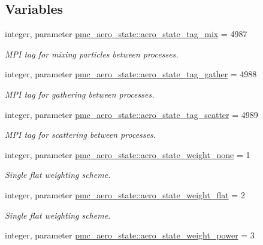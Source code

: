 \subsection*{Variables}
\begin{DoxyCompactItemize}
\item 
integer, parameter \mbox{\hyperlink{namespacepmc__aero__state_a585d061ace6ecfefa6eaadeb8efbeb5d}{pmc\+\_\+aero\+\_\+state\+::aero\+\_\+state\+\_\+tag\+\_\+mix}} = 4987
\begin{DoxyCompactList}\small\item\em M\+PI tag for mixing particles between processes. \end{DoxyCompactList}\item 
integer, parameter \mbox{\hyperlink{namespacepmc__aero__state_a8016b38f6c38806de95b72ffaecbe212}{pmc\+\_\+aero\+\_\+state\+::aero\+\_\+state\+\_\+tag\+\_\+gather}} = 4988
\begin{DoxyCompactList}\small\item\em M\+PI tag for gathering between processes. \end{DoxyCompactList}\item 
integer, parameter \mbox{\hyperlink{namespacepmc__aero__state_a47a81bec0174512abf54faf2673da5c3}{pmc\+\_\+aero\+\_\+state\+::aero\+\_\+state\+\_\+tag\+\_\+scatter}} = 4989
\begin{DoxyCompactList}\small\item\em M\+PI tag for scattering between processes. \end{DoxyCompactList}\item 
integer, parameter \mbox{\hyperlink{namespacepmc__aero__state_afae976ee50ab7c0415628dd99a6feded}{pmc\+\_\+aero\+\_\+state\+::aero\+\_\+state\+\_\+weight\+\_\+none}} = 1
\begin{DoxyCompactList}\small\item\em Single flat weighting scheme. \end{DoxyCompactList}\item 
integer, parameter \mbox{\hyperlink{namespacepmc__aero__state_a72b0c9b3118a486936fe3c50c4d908f6}{pmc\+\_\+aero\+\_\+state\+::aero\+\_\+state\+\_\+weight\+\_\+flat}} = 2
\begin{DoxyCompactList}\small\item\em Single flat weighting scheme. \end{DoxyCompactList}\item 
integer, parameter \mbox{\hyperlink{namespacepmc__aero__state_a2c80e8cba61697786d2302e44cd041bd}{pmc\+\_\+aero\+\_\+state\+::aero\+\_\+state\+\_\+weight\+\_\+power}} = 3

\end{DoxyCompactItemize}
